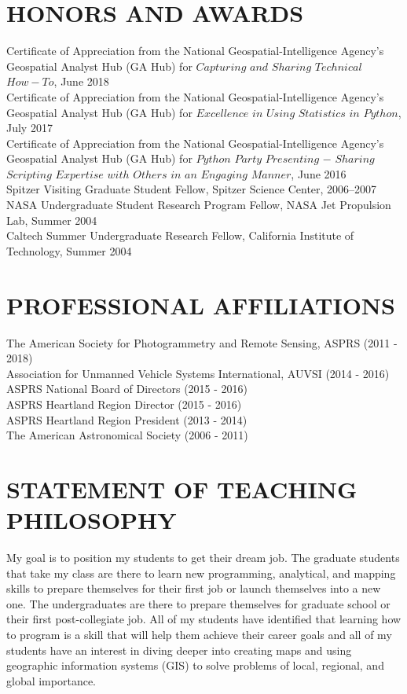 \documentclass{res}
\begin{document}
\begin{resume}
\section{HONORS AND AWARDS} 
	Certificate of Appreciation from the National Geospatial-Intelligence Agency's Geospatial Analyst Hub (GA Hub) for $Capturing$ $and$ $Sharing$ $Technical$ $How-To$, June 2018\\
	Certificate of Appreciation from the National Geospatial-Intelligence Agency's Geospatial Analyst Hub (GA Hub) for $Excellence$ $in$ $Using$ $Statistics$ $in$ $Python$, July 2017\\
	Certificate of Appreciation from the National Geospatial-Intelligence Agency's Geospatial Analyst Hub (GA Hub) for $Python$ $Party$ $Presenting$ $-$ $Sharing$ $Scripting$ $Expertise$ $with$ $Others$ $in$ $an$ $Engaging$ $Manner$, June 2016\\
   Spitzer Visiting Graduate Student Fellow, Spitzer Science Center, 2006--2007   \\      
   NASA Undergraduate Student Research Program Fellow, NASA Jet Propulsion Lab, Summer 2004\\        
   Caltech Summer Undergraduate Research Fellow, California Institute of Technology, Summer 2004  

\section{PROFESSIONAL AFFILIATIONS}      
The American Society for Photogrammetry and Remote Sensing, ASPRS (2011 - 2018)\\
Association for Unmanned Vehicle Systems International, AUVSI (2014 - 2016)\\
ASPRS National Board of Directors (2015 - 2016)\\
ASPRS Heartland Region Director (2015 - 2016)\\
ASPRS Heartland Region President (2013 - 2014)\\
The American Astronomical Society (2006 - 2011)\\


\section{STATEMENT OF TEACHING PHILOSOPHY}
My goal is to position my students to get their dream job. The graduate students that take my class are there to learn new programming, analytical, and mapping skills to prepare themselves for their first job or launch themselves into a new one. The undergraduates are there to prepare themselves for graduate school or their first post-collegiate job. All of my students have identified that learning how to program is a skill that will help them achieve their career goals and all of my students have an interest in diving deeper into creating maps and using geographic information systems (GIS) to solve problems of local, regional, and global importance.


\end{resume}
\end{document}
